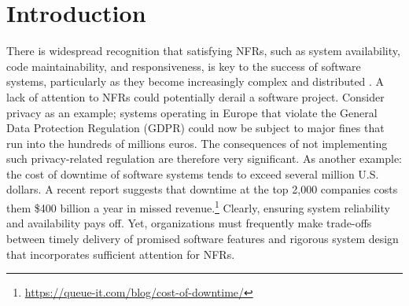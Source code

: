 \documentclass[smallextended]{svjour3}       %
\begin{document}
\begin{abstract}
Non-functional requirements (NFR) such as performance and maintainability are key to overall software quality. To ensure NFRs can be satisfied, it is important that developers and other stakeholders have a shared understanding of such NFRs to prevent divergence of interpretations and expensive rework as a result. 
This article is part of a research program to study the management of shared understanding of NFRs. We present a process theory comprising six propositions developed through secondary analysis of extensive field investigations of how small software organizations maintain a shared understanding of NFRs in fast-paced Continuous Software Engineering (CSE) contexts. Small organizations, including software startups, represent an important part of the software industry, but are categorically different from large organizations in that they have fewer financial and staff resources. 
Further, while literature has suggested general practices for building shared understanding, how this applies to NFRs specifically remains an open question.  
Based on this inductive theory development, the resultant theory explains how a lack of shared understanding is detected and addressed, and how the CSE context induces challenges in these processes.
\end{abstract}




\section{Introduction}\label{sec:introduction}
There is widespread recognition that satisfying NFRs, such as system availability, code maintainability, and responsiveness, is key to the success of software systems, particularly as they become increasingly complex and distributed \citep{wiegers2013software, glinz_non-functional_2007,caracciolo2014software,mairiza2010investigation}. 
A lack of attention to NFRs could potentially derail a software project. Consider privacy as an example; systems operating in Europe that violate the General Data Protection Regulation (GDPR) could now be subject to major fines that run into the hundreds of millions euros. 
The consequences of not implementing such privacy-related regulation are therefore very significant. As another example: the cost of downtime of software systems tends to exceed several million U.S. dollars. 
A recent report suggests that downtime at the top 2,000 companies costs them \$400 billion a year in missed revenue.\footnote{\url{https://queue-it.com/blog/cost-of-downtime/}} Clearly, ensuring system reliability and availability pays off. 
Yet, organizations must frequently make trade-offs between timely delivery of promised software features and rigorous system design that incorporates sufficient attention for NFRs.
\end{document}
